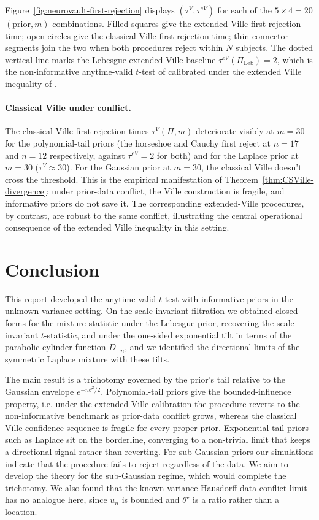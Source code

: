 \documentclass{article}%
\newcommand{\1}{\mathbf{1}}
\begin{document}
Figure~\ref{fig:neurovault-first-rejection} displays
$(\tau^{V}, \tau^{eV})$ for each of the $5 \times 4 = 20$
$(\text{prior}, m)$ combinations. Filled squares give the extended-Ville first-rejection time; open circles give the classical Ville first-rejection time; thin connector segments join the two when both procedures reject within $N$ subjects. The dotted vertical line marks the Lebesgue extended-Ville baseline $\tau^{eV}(\Pi_{\mathrm{Leb}}) = 2$, which is the non-informative anytime-valid $t$-test of \cite{Lai1976} calibrated under the extended Ville inequality of \cite{wang2025extended}.

\paragraph{Classical Ville under conflict.}
The classical Ville first-rejection times $\tau^{V}(\Pi, m)$ deteriorate visibly at $m = 30$ for the polynomial-tail priors (the
horseshoe and Cauchy first reject at $n = 17$ and $n = 12$ respectively, against $\tau^{eV} = 2$ for both) and for the Laplace prior at $m = 30$ ($\tau^{V} \approx 30$). For the Gaussian prior at $m=30$, the classical Ville doesn't cross the threshold. This is the empirical manifestation of Theorem~\ref{thm:CSVille-divergence}: under prior-data conflict, the Ville construction is fragile, and informative priors do not save it. The corresponding extended-Ville procedures, by contrast, are robust to the same conflict, illustrating the central operational consequence of the extended Ville inequality in this setting.


\section{Conclusion}

This report developed the anytime-valid $t$-test with informative priors in the
unknown-variance setting. On the scale-invariant filtration we obtained closed
forms for the mixture statistic under the Lebesgue prior, recovering the
scale-invariant $t$-statistic, and under the one-sided exponential tilt in terms
of the parabolic cylinder function $D_{-n}$, and we identified the directional
limits of the symmetric Laplace mixture with these tilts.

The main result is a trichotomy governed by the prior's tail relative to the
Gaussian envelope $e^{-n\theta^2/2}$. Polynomial-tail priors give the
bounded-influence property, i.e. under the extended-Ville calibration the procedure reverts to the non-informative benchmark as prior-data conflict grows, whereas the classical Ville confidence sequence is fragile for every proper prior. Exponential-tail priors such as Laplace sit on the borderline, converging to a non-trivial limit that keeps a directional signal rather than reverting. For sub-Gaussian priors our
simulations indicate that the procedure fails to reject regardless of the data. We
aim to develop the theory for the sub-Gaussian regime, which would complete the trichotomy. We also found that the known-variance Hausdorff data-conflict limit has no analogue here, since $u_n$ is bounded and $\theta^\star$ is a ratio rather than a location.
\end{document}
